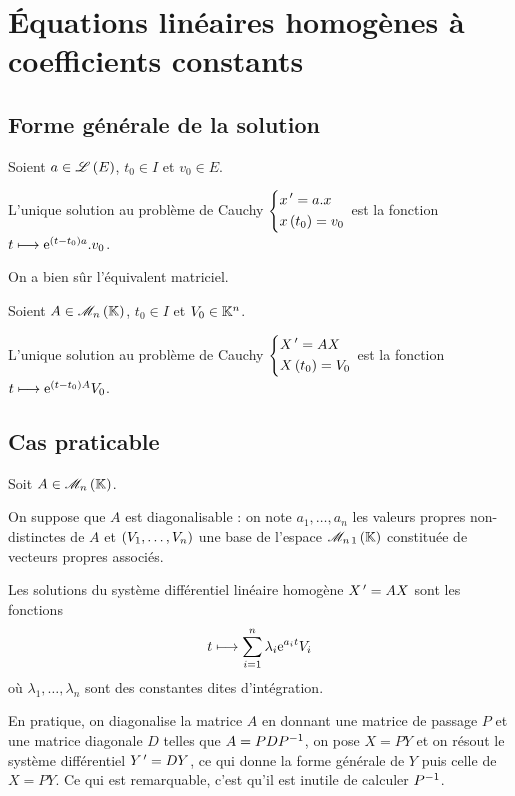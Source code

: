 \section{Équations linéaires homogènes à coefficients constants}

\subsection{Forme générale de la solution}

\begin{prop}
Soient \(a\in\mathscr{L}\left(E\right)\), \(t_0\in I\) et \(v_0\in E\).

L'unique solution au problème de Cauchy \(\begin{dcases}
x^{\,\prime}=a.x \\
x\left(t_0\right)=v_0
\end{dcases}\) est la fonction \(t\longmapsto\mathrm{e}^{\left(t-t_0\right)a}.v_0\).
\end{prop}

On a bien sûr l'équivalent matriciel.

\begin{prop}
Soient \(A\in\M{n}\), \(t_0\in I\) et \(V_0\in\mathbb{K}^n\).

L'unique solution au problème de Cauchy \(\begin{dcases}
X^{\,\prime}=AX \\
X\left(t_0\right)=V_0
\end{dcases}\) est la fonction \(t\longmapsto\mathrm{e}^{\left(t-t_0\right)A}V_0\).
\end{prop}

\subsection{Cas praticable}

\begin{prop}
Soit \(A\in\M{n}\).

On suppose que \(A\) est diagonalisable : on note \(a_1,\dots,a_n\) les valeurs propres non-distinctes de \(A\) et \(\left(V_1,\dots,V_n\right)\) une base de l'espace \(\M{n\,1}\) constituée de vecteurs propres associés.

Les solutions du système différentiel linéaire homogène \(X^{\,\prime}=AX\) sont les fonctions \[t\longmapsto\sum_{i=1}^n\lambda_i\mathrm{e}^{a_it}V_i\] où \(\lambda_1,\dots,\lambda_n\) sont des constantes dites d'intégration.
\end{prop}

En pratique, on diagonalise la matrice \(A\) en donnant une matrice de passage \(P\) et une matrice diagonale \(D\) telles que \(A=PDP^{-1}\), on pose \(X=PY\) et on résout le système différentiel \(Y^{\,\prime}=DY\), ce qui donne la forme générale de \(Y\) puis celle de \(X=PY\). Ce qui est remarquable, c'est qu'il est inutile de calculer \(P^{-1}\).


